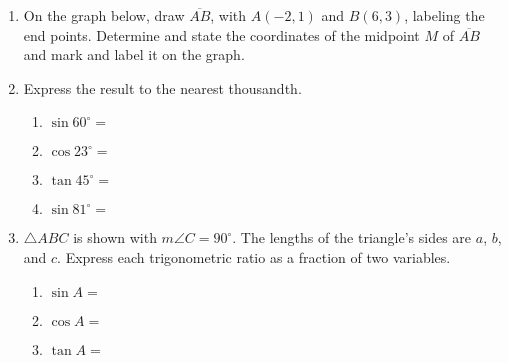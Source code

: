 \documentclass[12pt, twoside]{article}
\begin{document}
\begin{enumerate}
\newpage

    \item On the graph below, draw $\overline{AB}$, with $A(-2,1)$ and $B(6,3)$, labeling the end points. Determine and state the coordinates of the midpoint $M$ of $\overline{AB}$ and mark and label it on the graph.\\


      \item Express the result to the nearest thousandth.  %
        \begin{multicols}{2}
          \begin{enumerate}
            \item $\sin 60^\circ = $ \vspace{0.5cm}
            \item $\cos 23^\circ =$
            \item $\tan 45^\circ = $ \vspace{0.5cm}
            \item $\sin 81^\circ =$
          \end{enumerate}
        \end{multicols}

      \item $\triangle ABC$ is shown with $m\angle C=90^\circ$. The lengths of the triangle's sides are $a$, $b$, and $c$. Express each trigonometric ratio as a fraction of two variables.
      \begin{multicols}{2}

          \begin{enumerate}
          \item $\sin A =$ \vspace{0.75cm}
          \item $\cos A =$ \vspace{0.75cm}
          \item $\tan A =$
        \end{enumerate}
    \end{multicols}


\end{enumerate}
\end{document}
